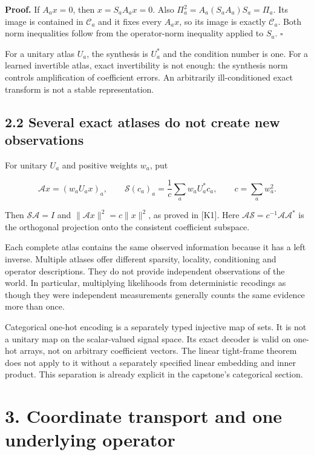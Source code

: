 \documentclass[11pt,letterpaper]{article}
\begin{document}
\textbf{Proof.} If \(A_ax=0\), then \(x=S_aA_ax=0\). Also
\(\Pi_a^2=A_a(S_aA_a)S_a=\Pi_a\). Its image is contained in
\(\mathcal C_a\) and it fixes every \(A_ax\), so its image is exactly
\(\mathcal C_a\). Both norm inequalities follow from the operator-norm
inequality applied to \(S_a\). \(\square\)

For a unitary atlas \(U_a\), the synthesis is \(U_a^*\) and the
condition number is one. For a learned invertible atlas, exact
invertibility is not enough: the synthesis norm controls amplification
of coefficient errors. An arbitrarily ill-conditioned exact transform is
not a stable representation.

\subsection{2.2 Several exact atlases do not create new
observations}\label{several-exact-atlases-do-not-create-new-observations}

For unitary \(U_a\) and positive weights \(w_a\), put

\[
\mathcal Ax=(w_aU_ax)_a,\qquad
\mathcal S(c_a)_a=\frac{1}{c}\sum_aw_aU_a^*c_a,
\qquad c=\sum_aw_a^2.
\]

Then \(\mathcal S\mathcal A=I\) and \(\|\mathcal Ax\|^2=c\|x\|^2\), as
proved in {[}K1{]}. Here
\(\mathcal A\mathcal S=c^{-1}\mathcal A\mathcal A^*\) is the orthogonal
projection onto the consistent coefficient subspace.

Each complete atlas contains the same observed information because it
has a left inverse. Multiple atlases offer different sparsity, locality,
conditioning and operator descriptions. They do not provide independent
observations of the world. In particular, multiplying likelihoods from
deterministic recodings as though they were independent measurements
generally counts the same evidence more than once.

Categorical one-hot encoding is a separately typed injective map of
sets. It is not a unitary map on the scalar-valued signal space. Its
exact decoder is valid on one-hot arrays, not on arbitrary coefficient
vectors. The linear tight-frame theorem does not apply to it without a
separately specified linear embedding and inner product. This separation
is already explicit in the capstone's categorical section.

\section{3. Coordinate transport and one underlying
operator}\label{coordinate-transport-and-one-underlying-operator}
\end{document}
